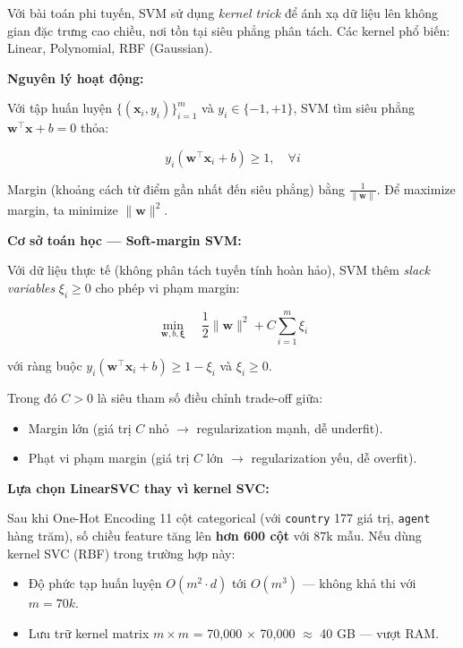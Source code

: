 \documentclass[12pt, a4paper]{article}
\begin{document}
Với bài toán phi tuyến, SVM sử dụng \emph{kernel trick} để ánh xạ dữ liệu lên không gian đặc trưng cao chiều, nơi tồn tại siêu phẳng phân tách. Các kernel phổ biến: Linear, Polynomial, RBF (Gaussian).

\textbf{Nguyên lý hoạt động:}

Với tập huấn luyện $\{(\mathbf{x}_i, y_i)\}_{i=1}^m$ và $y_i \in \{-1, +1\}$, SVM tìm siêu phẳng $\mathbf{w}^\top \mathbf{x} + b = 0$ thỏa:

\begin{equation}
y_i (\mathbf{w}^\top \mathbf{x}_i + b) \geq 1, \quad \forall i
\end{equation}

Margin (khoảng cách từ điểm gần nhất đến siêu phẳng) bằng $\frac{1}{\|\mathbf{w}\|}$. Để maximize margin, ta minimize $\|\mathbf{w}\|^2$.

\textbf{Cơ sở toán học --- Soft-margin SVM:}

Với dữ liệu thực tế (không phân tách tuyến tính hoàn hảo), SVM thêm \emph{slack variables} $\xi_i \geq 0$ cho phép vi phạm margin:

\begin{equation}
\min_{\mathbf{w}, b, \boldsymbol{\xi}} \quad \frac{1}{2} \|\mathbf{w}\|^2 + C \sum_{i=1}^{m} \xi_i
\end{equation}

với ràng buộc $y_i (\mathbf{w}^\top \mathbf{x}_i + b) \geq 1 - \xi_i$ và $\xi_i \geq 0$.

Trong đó $C > 0$ là siêu tham số điều chỉnh trade-off giữa:
\begin{itemize}
    \item Margin lớn (giá trị $C$ nhỏ $\to$ regularization mạnh, dễ underfit).
    \item Phạt vi phạm margin (giá trị $C$ lớn $\to$ regularization yếu, dễ overfit).
\end{itemize}

\textbf{Lựa chọn LinearSVC thay vì kernel SVC:}

Sau khi One-Hot Encoding 11 cột categorical (với \texttt{country} 177 giá trị, \texttt{agent} hàng trăm), số chiều feature tăng lên \textbf{hơn 600 cột} với 87k mẫu. Nếu dùng kernel SVC (RBF) trong trường hợp này:
\begin{itemize}
    \item Độ phức tạp huấn luyện $O(m^2 \cdot d)$ tới $O(m^3)$ --- không khả thi với $m = 70k$.
    \item Lưu trữ kernel matrix $m \times m$ = 70{,}000 $\times$ 70{,}000 $\approx$ 40 GB --- vượt RAM.
\end{itemize}
\end{document}
